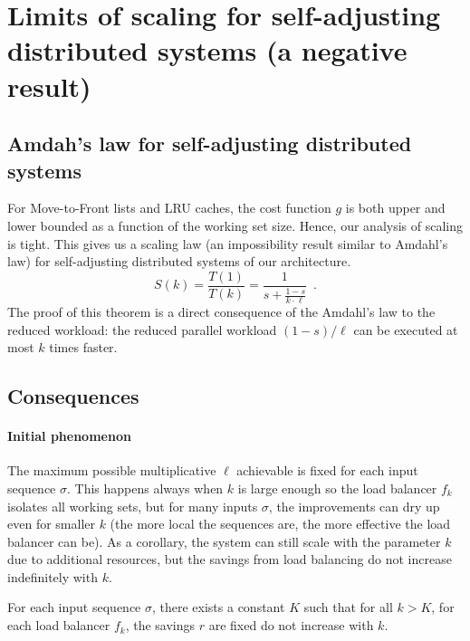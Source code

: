 
\section{Limits of scaling for self-adjusting distributed systems (a negative result)}

\subsection{Amdah's law for self-adjusting distributed systems}

For Move-to-Front lists and LRU caches, the cost function $g$ is both upper and lower bounded as a function of the working set size. Hence, our analysis of scaling is tight.
This gives us a scaling law (an impossibility result similar to Amdahl's law) for self-adjusting distributed systems of our architecture.
 \begin{displaymath}
    S(k) = \frac{T(1)}{T(k)} = \frac{1}{s + \frac{1-s}{k \cdot \ell}} \enspace .
  \end{displaymath}
 The proof of this theorem is a direct consequence of the Amdahl's law to the reduced workload: the reduced parallel workload $(1-s)/\ell$ can be executed at most $k$ times faster.
 
\subsection{Consequences}
\paragraph*{Initial phenomenon}

The maximum possible multiplicative $\ell$ achievable is fixed for each input sequence $\sigma$. 
This happens always when $k$ is large enough so the load balancer $f_k$ isolates all working sets, but for many inputs $\sigma$, the improvements can dry up even for smaller $k$ (the more local the sequences are, the more effective the load balancer can be).
As a corollary, the system can still scale with the parameter $k$ due to additional resources, but the savings from load balancing do not increase indefinitely with $k$.
\begin{observation}
	For each input sequence $\sigma$, there exists a constant $K$ such that for all $k > K$, for each load balancer $f_k$, the savings $r$ are fixed do not increase with $k$.
\end{observation}


